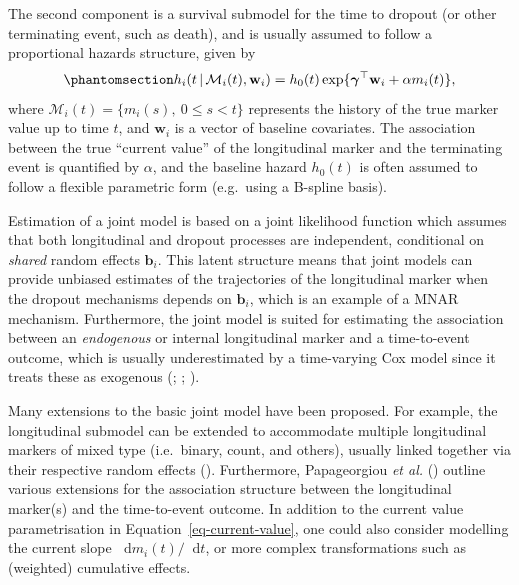 \documentclass[
  letterpaper,
  paper=240mm:170mm,
  twoside=true,
  open=right,
  fontsize=10pt,
  pagesize=false,
  BCOR=15mm,
  DIV=14,
  headinclude=true,
  footinclude=false,
  headsepline=on]{scrbook}
\newcommand{\given}{\,|\,}
\newcommand\diff{\mathop{}\!\mathrm{d}}
\begin{document}
The second component is a survival submodel for the time to dropout (or
other terminating event, such as death), and is usually assumed to
follow a proportional hazards structure, given by
\begin{equation}\phantomsection\label{eq-current-value}{
h_i(t \given \mathcal{M}_i(t),\mathbf{w}_i) = h_0(t)\exp\{\boldsymbol{\gamma}^\top\mathbf{w}_i + \alpha m_i(t)\},
}\end{equation} where \(\mathcal{M}_i(t) = \{m_i(s), \ 0 \leq s < t\}\)
represents the history of the true marker value up to time \(t\), and
\(\mathbf{w}_i\) is a vector of baseline covariates. The association
between the true ``current value'' of the longitudinal marker and the
terminating event is quantified by \(\alpha\), and the baseline hazard
\(h_0(t)\) is often assumed to follow a flexible parametric form
(e.g.~using a B-spline basis).

Estimation of a joint model is based on a joint likelihood function
which assumes that both longitudinal and dropout processes are
independent, conditional on \emph{shared} random effects
\(\boldsymbol{b}_i\). This latent structure means that joint models can
provide unbiased estimates of the trajectories of the longitudinal
marker when the dropout mechanisms depends on \(\boldsymbol{b}_i\),
which is an example of a MNAR mechanism. Furthermore, the joint model is
suited for estimating the association between an \emph{endogenous} or
internal longitudinal marker and a time-to-event outcome, which is
usually underestimated by a time-varying Cox model since it treats these
as exogenous (;
;
).

Many extensions to the basic joint model have been proposed. For
example, the longitudinal submodel can be extended to accommodate
multiple longitudinal markers of mixed type (i.e.~binary, count, and
others), usually linked together via their respective random effects
(). Furthermore, Papageorgiou \emph{et al.}
() outline
various extensions for the association structure between the
longitudinal marker(s) and the time-to-event outcome. In addition to the
current value parametrisation in Equation~\ref{eq-current-value}, one
could also consider modelling the current slope
\(\diff m_i(t) / \diff t\), or more complex transformations such as
(weighted) cumulative effects.
\end{document}
